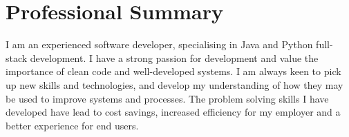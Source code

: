 \section{Professional Summary}

I am an experienced software developer, specialising in Java and Python full-stack development. 
I have a strong passion for development and value the importance of clean code and well-developed systems. 
I am always keen to pick up new skills and technologies, and develop my understanding of how they may be used to improve systems and processes.
The problem solving skills I have developed have lead to cost savings, increased efficiency for my employer and a better experience for end users.